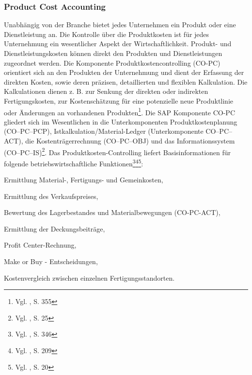\subsubsection{Product Cost Accounting}
Unabhängig von der Branche bietet jedes Unternehmen ein Produkt oder eine Dienstleistung an. Die Kontrolle über die Produktkosten ist für jedes Unternehmung ein wesentlicher Aspekt der Wirtschaftlichkeit. Produkt- und Dienstleistungskosten können direkt den Produkten und Dienstleistungen zugeordnet werden. Die Komponente Produktkostencontrolling (CO-PC) orientiert sich an den Produkten der Unternehmung und dient der Erfassung der direkten Kosten, sowie deren präzisen, detaillierten und flexiblen Kalkulation. Die Kalkulationen dienen z. B. zur Senkung der direkten oder indirekten Fertigungskosten, zur Kostenschätzung für eine potenzielle neue Produktlinie oder Änderungen an vorhandenen Produkten\footnote{Vgl. \cite{Patel2009}, S. 355}.
Die SAP Komponente CO-PC gliedert sich im Wesentlichen in die Unterkomponenten Produktkostenplanung (CO--PC--PCP), Istkalkulation/Material-Ledger (Unterkomponente CO--PC--ACT), die Kostenträgerrechnung (CO--PC--OBJ) und das Informationssystem (CO--PC--IS)\footnote{Vgl. \cite{Friedl2008}, S. 25}.
Das Produktkosten-Controlling liefert Basisinformationen für folgende betriebswirtschaftliche Funktionen\footnote{Vgl. \cite{Maassen2006}, S. 346}\footnote{Vgl. \cite{Klein2010}, S. 209}\footnote{Vgl. \cite{SAPCOPCPCP2001}, S. 20}:
\begin{compactitem}
\item  Ermittlung Material-, Fertigungs- und Gemeinkosten,
\item  Ermittlung des Verkaufspreises,
\item  Bewertung des Lagerbestandes und Materialbewegungen (CO-PC-ACT), 
\item  Ermittlung der Deckungsbeiträge,
\item Profit Center-Rechnung,
\item Make or Buy - Entscheidungen,
\item Kostenvergleich zwischen einzelnen Fertigungsstandorten.
\end{compactitem}

